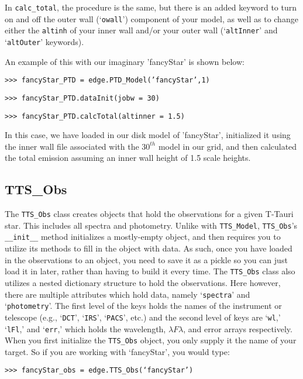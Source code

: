 \documentclass{article}
\begin{document}
 
In \texttt{calc\_total}, the procedure is the same, but there is an added keyword to turn on and off the outer wall (‘\texttt{owall}’) component of your model, as well as to change either the \texttt{altinh} of your inner wall and/or your outer wall (‘\texttt{altInner}’ and ‘\texttt{altOuter}’ keywords). 
 
 An example of this with our imaginary 'fancyStar' is shown below:

\vspace{2mm}
\texttt{>>> fancyStar\_PTD = edge.PTD\_Model('fancyStar',1)}

\texttt{>>> fancyStar\_PTD.dataInit(jobw = 30)}

\texttt{>>> fancyStar\_PTD.calcTotal(altinner = 1.5)}
\vspace{2mm}
 
In this case, we have loaded in our disk model of 'fancyStar', initialized it using the inner wall file associated with the $30^{th}$ model in our grid, and then calculated the total emission assuming an inner wall height of 1.5 scale heights. 
 
 
\subsection{TTS\_Obs}
 
The \texttt{TTS\_Obs} class creates objects that hold the observations for a given T-Tauri star. This includes all spectra and photometry. Unlike with \texttt{TTS\_Model}, \texttt{TTS\_Obs}’s \texttt{\_\_init\_\_} method initializes a mostly-empty object, and then requires you to utilize its methods to fill in the object with data. As such, once you have loaded in the observations to an object, you need to save it as a pickle so you can just load it in later, rather than having to build it every time. 
The \texttt{TTS\_Obs} class also utilizes a nested dictionary structure to hold the observations. Here however, there are multiple attributes which hold data, namely `\texttt{spectra}' and `\texttt{photometry}'. The first level of the keys holds the names of the instrument or telescope (e.g., ‘\texttt{DCT}’, ‘\texttt{IRS}’, ‘\texttt{PACS}’, etc.) and the second level of keys are ‘\texttt{wl},’ ‘\texttt{lFl},’ and ‘\texttt{err},’ which holds the wavelength, $\lambda F\lambda$, and error arrays respectively.  
When you first initialize the \texttt{TTS\_Obs} object, you only supply it the name of your target. So if you are working with `fancyStar', you would type: 

\vspace{2mm}
\texttt{>>> fancyStar\_obs = edge.TTS\_Obs(‘fancyStar’)}
\vspace{2mm}
\end{document}
